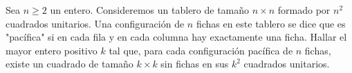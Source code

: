 Sea $n \geq 2$ un entero. Consideremos un tablero de tamaño $n \times n$ formado por $n^2$ cuadrados unitarios. Una configuración de $n$ fichas en este tablero se dice que es "pacífica" si en cada fila y en cada columna hay exactamente una ficha. Hallar el mayor entero positivo $k$ tal que, para cada configuración pacífica de $n$ fichas, existe un cuadrado de tamaño $k \times k$ sin fichas en sus $k^2$ cuadrados unitarios.